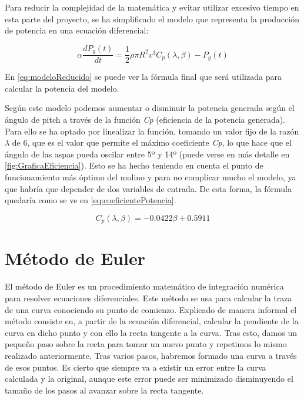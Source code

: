 Para reducir la complejidad de la matemática y evitar utilizar excesivo tiempo en esta parte del proyecto, se ha simplificado el modelo que representa la producción de potencia en una ecuación diferencial:

\begin{equation}
    \alpha \frac{dP_{g}(t)}{dt} = \frac{1}{2} \rho \pi R^2 v^3 C_{p}(\lambda,\beta) - P_{g}(t)
    \label{eq:modeloReducido}
\end{equation}

En \ref{eq:modeloReducido} se puede ver la fórmula final que será utilizada para calcular la potencia del modelo.

Según este modelo podemos aumentar o disminuir la potencia generada según el ángulo de pitch a través de la función \textit{Cp} (eficiencia de la potencia generada). Para ello se ha optado por linealizar la función, tomando un valor fijo de la razón \textit{$\lambda$} de 6, que es el valor que permite el máximo coeficiente \textit{Cp}, lo que hace que el ángulo de las aspas pueda oscilar entre 5º y 14º (puede verse en más detalle en \ref{fig:GraficaEficiencia}). Esto se ha hecho teniendo en cuenta el punto de funcionamiento más óptimo del molino y para no complicar mucho el modelo, ya que habría que depender de dos variables de entrada.
De esta forma, la fórmula quedaría como se ve en \ref{eq:coeficientePotencia}.

\label{fig:GraficaEficiencia}

\begin{equation}
    C_{p}(\lambda,\beta) = -0.0422 \beta + 0.5911
    \label{eq:coeficientePotencia}
\end{equation}

\section{Método de Euler}

El método de Euler es un procedimiento matemático de integración numérica para resolver ecuaciones diferenciales. Este método se usa para calcular la traza de una curva conociendo su punto de comienzo.
Explicado de manera informal el método consiste en, a partir de la ecuación diferencial, calcular la pendiente de la curva en dicho punto y con ello la recta tangente a la curva. Tras esto, damos un pequeño paso sobre la recta para tomar un nuevo punto y repetimos lo mismo realizado anteriormente.
Tras varios pasos, habremos formado una curva a través de esos puntos. Es cierto que siempre va a existir un error entre la curva calculada y la original, aunque este error puede ser minimizado disminuyendo el tamaño de los pasos al avanzar sobre la recta tangente.

